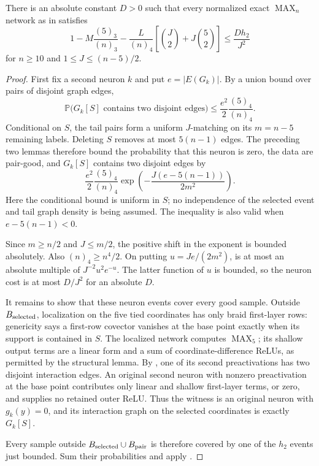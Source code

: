 \begin{proposition}\label{prop:fixed-pair-counting}
There is an absolute constant $D>0$ such that every normalized exact
$\operatorname{MAX}_n$ network as in  satisfies
\begin{equation}\label{eq:fixed-pair-counting}
 1-M\frac{(5)_3}{(n)_3}
  -\frac{L}{(n)_4}\left[\binom J2+J\binom52\right]
 \le \frac{D h_2}{J^2}
\end{equation}
for $n\ge10$ and $1\le J\le(n-5)/2$.
\end{proposition}
\begin{proof}
First fix a second neuron $k$ and put $e=|E(G_k)|$.
By a union bound over pairs of disjoint graph edges,
\[
 \mathbb P\bigl(G_k[S]\text{ contains two disjoint edges}\bigr)
 \le \frac{e^2}{2}\frac{(5)_4}{(n)_4}.
\]
Conditional on $S$, the tail pairs form a uniform $J$-matching on its
$m=n-5$ remaining labels. Deleting $S$ removes at most $5(n-1)$ edges.
The preceding two lemmas therefore bound the probability that this neuron
is zero, the data are pair-good, and $G_k[S]$ contains two disjoint edges by
\begin{equation}\label{eq:fixed-pair-neuron-cost}
 \frac{e^2}{2}\frac{(5)_4}{(n)_4}
 \exp\!\left(-\frac{J(e-5(n-1))}{2m^2}\right).
\end{equation}
Here the conditional bound is uniform in $S$; no independence of the
selected event and tail graph density is being assumed. The inequality
is also valid when $e-5(n-1)<0$.

Since $m\ge n/2$ and $J\le m/2$, the positive shift in the exponent is
bounded absolutely. Also $(n)_4\ge n^4/2$. On putting $u=Je/(2m^2)$,
 is at most an absolute multiple of
$J^{-2}u^2e^{-u}$. The latter function of $u$ is bounded, so the neuron
cost is at most $D/J^2$ for an absolute $D$.

It remains to show that these neuron events cover every good sample.
Outside $B_{\rm selected}$, localization on the five tied coordinates
has only braid first-layer rows: genericity says a first-row covector
vanishes at the base point exactly when its support is contained in $S$.
 The localized network computes $\operatorname{MAX}_5$; its shallow output
 terms are a linear form and a sum of coordinate-difference ReLUs, as
 permitted by the structural lemma. By
, one of its second preactivations has
two disjoint interaction edges. An original second neuron with nonzero
preactivation at the base point contributes only linear and shallow
first-layer terms, or zero, and supplies no retained outer ReLU.
Thus the witness is an original neuron with
$g_k(y)=0$, and its interaction graph on the selected coordinates is
exactly $G_k[S]$.

Every sample outside $B_{\rm selected}\cup B_{\rm pair}$ is therefore
covered by one of the $h_2$ events just bounded. Sum their probabilities
and apply .
\end{proof}

